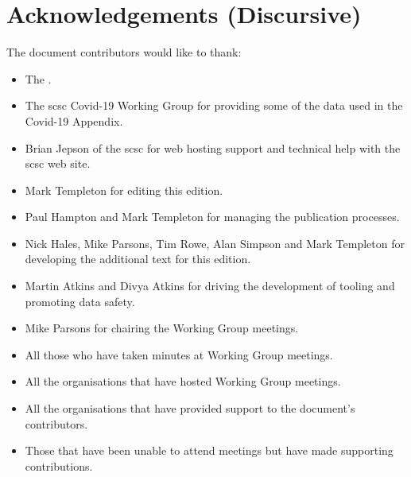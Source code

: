 %
%
\section{Acknowledgements (Discursive)} \label{bkm:acknowledgements}


The document contributors would like to thank:
\begin{itemize}
  \item The .
  \item The \gls{scsc} Covid-19 Working Group for providing some of the data used in the Covid-19 Appendix.
  \item Brian Jepson of the \gls{scsc} for web hosting support and technical help with the \gls{scsc} web site.
  \item
    Mark Templeton for editing this edition.
  \item Paul Hampton
    and
    Mark Templeton for managing the publication processes.
  \item
    Nick Hales, Mike Parsons, Tim Rowe, Alan Simpson and Mark Templeton
    for developing the additional text for this edition.
  \item
    Martin Atkins and Divya Atkins for driving the development of tooling and promoting data safety.
  \item Mike Parsons for chairing the Working Group meetings.
  \item All those who have taken minutes at Working Group meetings.
  \item
    All the organisations that have hosted Working Group meetings.
  \item All the organisations that have provided support to the document's contributors.
  \item Those that have been unable to attend meetings but have made supporting contributions.
\end{itemize}
